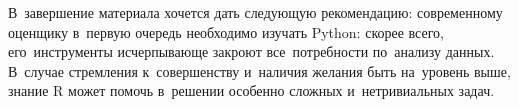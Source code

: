 \documentclass[]{scrartcl}
\begin{document}
В~завершение материала хочется дать следующую рекомендацию: современному оценщику в~первую очередь необходимо изучать Python: скорее всего, его~инструменты исчерпывающе закроют все~потребности по~анализу данных. В~случае стремления к~совершенству и~наличия желания быть на~уровень выше, знание R может помочь в~решении особенно сложных и~нетривиальных задач.

\clearpage
\printbibliography[title=Источники информации]
\end{document}
